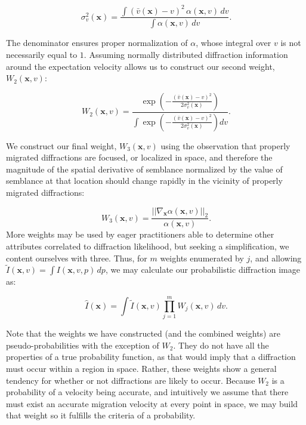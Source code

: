 \begin{equation}
\label{eq:velvar}
\sigma^2_v(\mathbf{x}) = \frac { \int \left( \bar{v} \left(\mathbf{x} \right)-v \right)^2 \, \alpha(\mathbf{x},v) \, dv }{ \int \alpha(\mathbf{x},v) \, dv }.
\end{equation}

The denominator ensures proper normalization of $\alpha$, whose integral over $v$ is not necessarily equal to $1$.
Assuming normally distributed diffraction information around the expectation velocity allows us to construct our second weight, $W_2(\mathbf{x},v)$:

\begin{equation}
\label{eq:wt2}
W_2(\mathbf{x},v) = \frac{ \exp \left( - \frac{\left( \bar{v}(\mathbf{x}) - v \right)^2}{2 \sigma^2_v(\mathbf{x})} \right)}{\int \exp \left( - \frac{\left( \bar{v}(\mathbf{x}) - v \right)^2}{2\sigma^2_v(\mathbf{x})} \right) dv }.
\end{equation}

We construct our final weight, $W_3(\mathbf{x},v)$ using the observation that properly migrated diffractions are focused, or localized in space, and therefore the magnitude of the spatial derivative of semblance normalized by the value of semblance at that location should change rapidly in the vicinity of properly migrated diffractions:


\begin{equation}
\label{eq:wt3}
W_3(\mathbf{x},v) =  \frac{\lvert \lvert \nabla_\mathbf{x} \alpha(\mathbf{x},v) \rvert \rvert_{2}}{\alpha(\mathbf{x},v)} .
\end{equation}
More weights may be used by eager practitioners able to determine other attributes correlated to diffraction likelihood, but seeking a simplification, we content ourselves with three.  Thus, for $m$ weights enumerated by $j$, and allowing $\tilde{I}(\mathbf{x},v) = \int I(\mathbf{x},v,p) \, dp$, we may calculate our probabilistic diffraction image as:

\begin{equation}
\label{eq:probimage}
\widehat{I}(\mathbf{x}) = \int \tilde{I}(\mathbf{x},v) \prod_{j=1}^m W_j(\mathbf{x},v) \, dv  .
\end{equation}


Note that the weights we have constructed (and the combined weights) are  pseudo-probabilities with the exception of $W_2$.  They do not have all the properties of a true probability function, as that would imply that a diffraction must occur within a region in space.  Rather, these weights show a general tendency for whether or not diffractions are likely to occur.  Because $W_2$ is a probability of a velocity being accurate, and intuitively we assume that there must exist an accurate migration velocity at every point in space, we may build that weight so it fulfills the criteria of a probability.  

